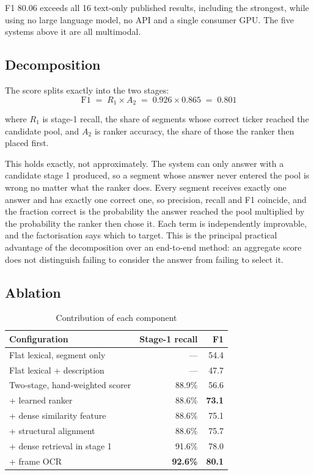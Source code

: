 \documentclass[conference]{IEEEtran}
\begin{document}
F1 80.06 exceeds all 16 text-only published results, including the strongest,
while using no large language model, no API and a single consumer GPU. The five
systems above it are all multimodal.

\subsection{Decomposition}

The score splits exactly into the two stages:
\begin{equation*}
  \mathrm{F1} \;=\; R_{1} \times A_{2} \;=\; 0.926 \times 0.865 \;=\; 0.801
\end{equation*}

where $R_{1}$ is stage-1 recall, the share of segments whose correct ticker
reached the candidate pool, and $A_{2}$ is ranker accuracy, the share of those
the ranker then placed first.

This holds exactly, not approximately. The system can only answer with a
candidate stage 1 produced, so a segment whose answer never entered the pool is
wrong no matter what the ranker does. Every segment receives exactly one answer
and has exactly one correct one, so precision, recall and F1 coincide, and the
fraction correct is the probability the answer reached the pool multiplied by
the probability the ranker then chose it.
Each term is independently improvable, and the factorisation says which to
target. This is the principal practical advantage of the decomposition over an
end-to-end method: an aggregate score does not distinguish failing to consider
the answer from failing to select it.

\subsection{Ablation}

\begin{table}[htbp]
\caption{Contribution of each component}
\label{tab:ablation}
\centering
\begin{tabular}{lrr}
\toprule
Configuration & Stage-1 recall & F1 \\
\midrule
Flat lexical, segment only & --- & 54.4 \\
Flat lexical + description & --- & 47.7 \\
Two-stage, hand-weighted scorer & 88.9\% & 56.6 \\
\quad + learned ranker & 88.6\% & \textbf{73.1} \\
\quad + dense similarity feature & 88.6\% & 75.1 \\
\quad + structural alignment & 88.6\% & 75.7 \\
\quad + dense retrieval in stage 1 & 91.6\% & 78.0 \\
\quad + frame OCR & \textbf{92.6\%} & \textbf{80.1} \\
\bottomrule
\end{tabular}
\end{table}
\end{document}
